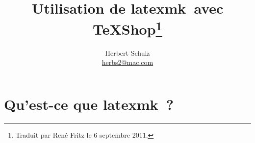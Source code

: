 \documentclass[11pt,french]{article}
\newcommand{\TS}{\textsf{\TeX Shop}}
\newcommand{\latexmk}{\textsf{latexmk}}
\newcommand{\cmd}[1]{\textsf{#1}}
\begin{document}
\title{Utilisation de \latexmk\ avec \TS\thanks{Traduit par René Fritz le 6 septembre 2011.}}
\author{Herbert Schulz\\\small\href{mailto:herbs2@mac.com}{herbs2@mac.com}}
\date{}


\maketitle
\thispagestyle{empty}

\section{Qu'est-ce que \latexmk\ ?}

\end{document}
